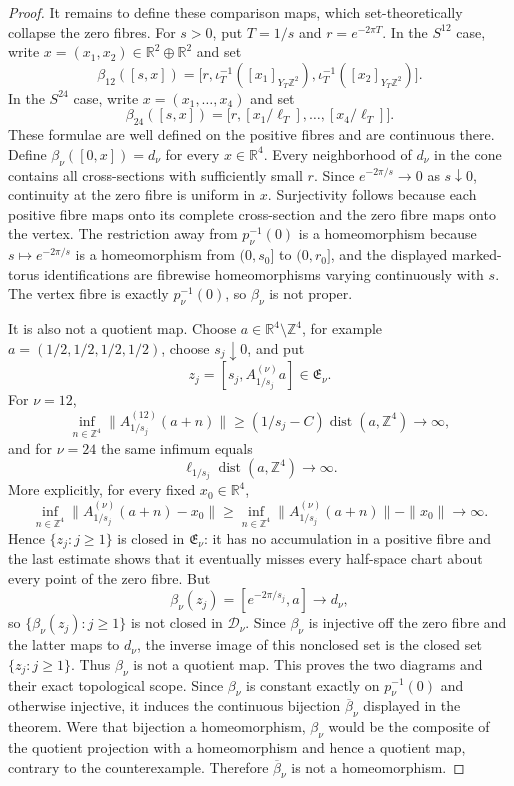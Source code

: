 \begin{proof}
It remains to define these comparison maps, which set-theoretically collapse
the zero fibres.  For \(s>0\), put
\(T=1/s\) and \(r=e^{-2\pi T}\).  In the \(S^{12}\) case, write
\(x=(x_1,x_2)\in\mathbb R^2\oplus\mathbb R^2\) and set
\[
 \beta_{12}([s,x])
 =\bigl[r,
 \iota_T^{-1}([x_1]_{Y_T\mathbb Z^2}),
 \iota_T^{-1}([x_2]_{Y_T\mathbb Z^2})\bigr].
\]
In the \(S^{24}\) case, write
\(x=(x_1,\ldots,x_4)\) and set
\[
 \beta_{24}([s,x])
 =\bigl[r,
 [x_1/\ell_T],\ldots,[x_4/\ell_T]\bigr].
\]
These formulae are well defined on the positive fibres and are continuous
there.  Define \(\beta_\nu([0,x])=d_\nu\) for every \(x\in\mathbb R^4\).
Every neighborhood of \(d_\nu\) in the cone contains all cross-sections
with sufficiently small \(r\).  Since \(e^{-2\pi/s}\to0\) as
\(s\downarrow0\), continuity at the zero fibre is uniform in \(x\).
Surjectivity follows because each positive fibre maps onto its complete
cross-section and the zero fibre maps onto the vertex.  The restriction away
from \(p_\nu^{-1}(0)\) is a homeomorphism because
\(s\mapsto e^{-2\pi/s}\) is a homeomorphism from \((0,s_0]\) to
\((0,r_0]\), and the displayed marked-torus identifications are fibrewise
homeomorphisms varying continuously with \(s\).  The vertex fibre is exactly
\(p_\nu^{-1}(0)\), so \(\beta_\nu\) is not proper.

It is also not a quotient map.  Choose
\(a\in\mathbb R^4\setminus\mathbb Z^4\), for example
\(a=(1/2,1/2,1/2,1/2)\), choose \(s_j\downarrow0\), and put
\[
 z_j=[s_j,A_{1/s_j}^{(\nu)}a]\in\mathfrak E_\nu.
\]
For \(\nu=12\),
\[
 \inf_{n\in\mathbb Z^4}
 \|A_{1/s_j}^{(12)}(a+n)\|
 \geq(1/s_j-C)\operatorname{dist}(a,\mathbb Z^4)
 \longrightarrow\infty,
\]
and for \(\nu=24\) the same infimum equals
\[
 \ell_{1/s_j}\operatorname{dist}(a,\mathbb Z^4)
 \longrightarrow\infty.
\]
More explicitly, for every fixed \(x_0\in\mathbb R^4\),
\[
 \inf_{n\in\mathbb Z^4}
 \|A_{1/s_j}^{(\nu)}(a+n)-x_0\|
 \geq
 \inf_{n\in\mathbb Z^4}\|A_{1/s_j}^{(\nu)}(a+n)\|-\|x_0\|
 \longrightarrow\infty.
\]
Hence \(\{z_j:j\geq1\}\) is closed in \(\mathfrak E_\nu\): it has no
accumulation in a positive fibre and the last estimate shows that it
eventually misses every half-space chart about every point of the zero
fibre.  But
\[
 \beta_\nu(z_j)=[e^{-2\pi/s_j},a]\longrightarrow d_\nu,
\]
so \(\{\beta_\nu(z_j):j\geq1\}\) is not closed in \(\mathcal D_\nu\).
Since \(\beta_\nu\) is injective off the zero fibre and the latter maps to
\(d_\nu\), the inverse image of this nonclosed set is the closed set
\(\{z_j:j\geq1\}\).  Thus \(\beta_\nu\) is not a quotient map.  This proves
the two diagrams and their exact topological scope.  Since \(\beta_\nu\) is
constant exactly on \(p_\nu^{-1}(0)\) and otherwise injective, it induces the
continuous bijection \(\overline\beta_\nu\) displayed in the theorem.  Were
that bijection a homeomorphism, \(\beta_\nu\) would be the composite of the
quotient projection with a homeomorphism and hence a quotient map, contrary
to the counterexample.  Therefore \(\overline\beta_\nu\) is not a
homeomorphism.
\end{proof}

